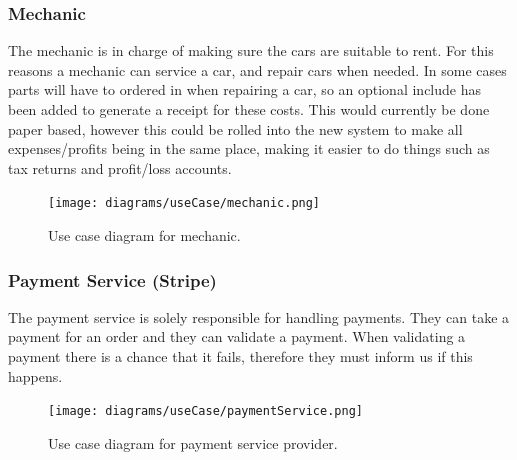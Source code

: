     \subsubsection{Mechanic}
      The mechanic is in charge of making sure the cars are suitable to rent. For this reasons a mechanic can service a car, and repair cars
      when needed. In some cases parts will have to ordered in when repairing a car, so an optional include has been added to generate a receipt
      for these costs. This would currently be done paper based, however this could be rolled into the new system to make all expenses/profits 
      being in the same place, making it easier to do things such as tax returns and profit/loss accounts.
      \begin{figure}[H]
        \centering
        \texttt{[image: diagrams/useCase/mechanic.png]}
        \caption{Use case diagram for mechanic.}
        \label{fig:UCmechanic}
      \end{figure}

    \subsubsection{Payment Service (Stripe)}
      The payment service is solely responsible for handling payments. They can take a payment for an order and they can
      validate a payment. When validating a payment there is a chance that it fails, therefore they must inform us if this
      happens.
      \begin{figure}[H]
        \centering
        \texttt{[image: diagrams/useCase/paymentService.png]}
        \caption{Use case diagram for payment service provider.}
        \label{fig:UCpayment}
      \end{figure}
\newpage